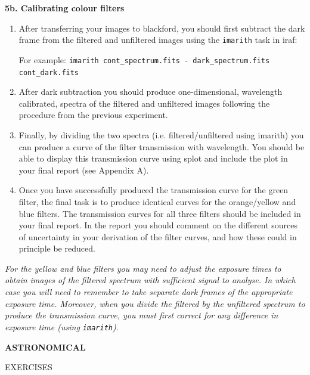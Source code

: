 \documentclass[12pt]{article}
\begin{document}
\newpage

{\bf 5b. Calibrating colour filters}

\begin{enumerate}

\item After transferring your images to blackford, you should first subtract the dark frame from the filtered and unfiltered images using the {\tt imarith} task in {\sc iraf}:

   For example: {\tt \verb,imarith cont_spectrum.fits - dark_spectrum.fits cont_dark.fits,}

\item After dark subtraction you should produce one-dimensional, wavelength calibrated, spectra of the filtered and unfiltered images following the procedure from the previous experiment.

\item Finally, by dividing the two spectra (i.e. filtered/unfiltered using {\sc imarith}) you can produce a curve of the filter transmission with wavelength. You should be able to display this transmission curve using {\sc splot} and include the plot in your final report (see Appendix A).

\item Once you have successfully produced the transmission curve for the green filter, the final task is to produce identical curves for the orange/yellow and blue filters. The transmission curves for all three filters should be included in your final report. In the report you should comment on the different sources of uncertainty in your derivation of the filter curves, and how these could in principle be reduced.

\end{enumerate}

{\it For the yellow and blue filters you may need to adjust the exposure times to obtain images of the filtered spectrum with sufficient signal to analyse. In which case you will need to remember to take separate dark frames of the appropriate exposure time. Moreover, when you divide the filtered by the unfiltered spectrum to produce the transmission curve, you must first correct for any difference in exposure time (using {\tt imarith})}.

\newpage

\pagestyle{empty}
\vspace*{6cm}

\begin{center}
{\Large\bf ASTRONOMICAL

EXERCISES}
\end{center}
\end{document}
